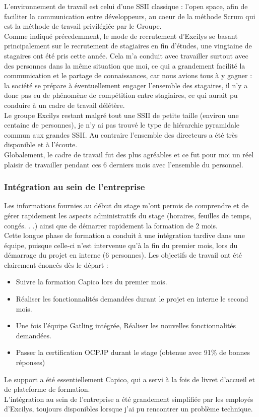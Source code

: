 L'environnement de travail est celui d'une SSII \og classique \fg{} : l'open space, afin de faciliter la communication entre développeurs, au coeur de la méthode Scrum qui est la méthode de travail privilégiée par le Groupe.\\
Comme indiqué précedemment, le mode de recrutement  d'Excilys se basant principalement sur le recrutement de stagiaires en fin d'études, une vingtaine de stagaires ont été pris cette année. Cela m'a conduit avec travailler surtout avec des personnes dans la même situation que moi, ce qui a grandement facilité la communication et le partage de connaissances, car nous avions tous à y gagner : la société se prépare à éventuellement engager l'ensemble des stagaires, il n'y a donc pas eu de phénomène de compétition entre stagiaires, ce qui aurait pu conduire à un cadre de travail délétère.\\

Le groupe Excilys restant malgré tout une SSII de petite taille (environ une centaine de personnes), je n'y ai pas trouvé le type de hiérarchie pyramidale commun aux grandes SSII. Au contraire l'ensemble des directeurs a été très disponible et à l'écoute.\\

Globalement, le cadre de travail fut des plus agréables et ce fut pour moi un réel plaisir de travailler pendant ces 6 derniers mois avec l'ensemble du personnel.

\subsubsection{Intégration au sein de l'entreprise}

Les informations fournies au début du stage m’ont permis de comprendre et de gérer rapidement les aspects administratifs du stage (horaires, feuilles de temps, congés. . .) ainsi que de démarrer rapidement la formation de 2 mois.\\
Cette longue phase de formation a conduit à une intégration tardive dans une équipe, puisque celle-ci n’est intervenue qu'à la fin du premier mois, lors du démarrage du projet en interne (6 personnes). Les objectifs de travail ont été clairement  énoncés dès le départ :
\begin{itemize}
	\item Suivre la formation Capico lors du premier mois.
	\item Réaliser les fonctionnalités demandées durant le projet en interne le second mois.
	\item Une fois l'équipe Gatling intégrée, Réaliser les nouvelles fonctionnalités demandées.
	\item Passer la certification OCPJP durant le stage (obtenue avec 91\% de bonnes réponses)
\end{itemize} 
Le support a été essentiellement Capico, qui a servi à la fois de livret d’accueil et de plateforme de formation.\\

L'intégration au sein de l'entreprise a été grandement simplifiée par les employés d'Excilys, toujours disponibles lorsque j'ai pu rencontrer un problème technique.\\